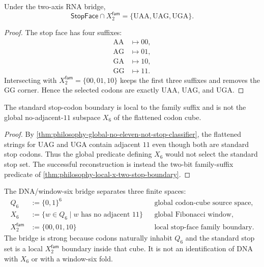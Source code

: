 \begin{theorem}
\label{thm:philosophy-local-x-two-stop-boundary}
Under the two-axis RNA bridge,
$$
  \mathsf{StopFace}\cap X_{2}^{\mathsf{fam}}
  =
  \{\mathrm{UAA},\mathrm{UAG},\mathrm{UGA}\}.
$$
\end{theorem}
\begin{proof}
The stop face has four suffixes:
$$
\begin{aligned}
  \mathrm{AA} &\longmapsto 00,\\
  \mathrm{AG} &\longmapsto 01,\\
  \mathrm{GA} &\longmapsto 10,\\
  \mathrm{GG} &\longmapsto 11.
\end{aligned}
$$
Intersecting with $X_{2}^{\mathsf{fam}}=\{00,01,10\}$ keeps the first
three suffixes and removes the $\mathrm{GG}$ corner. Hence the selected
codons are exactly $\mathrm{UAA}$, $\mathrm{UAG}$, and $\mathrm{UGA}$.
\end{proof}

\begin{theorem}
\label{thm:philosophy-local-x-two-not-global-x-six}
The standard stop-codon boundary is local to the family suffix and is
not the global no-adjacent-$11$ subspace $X_{6}$ of the flattened codon
cube.
\end{theorem}
\begin{proof}
By \autoref{thm:philosophy-global-no-eleven-not-stop-classifier}, the
flattened strings for $\mathrm{UAG}$ and $\mathrm{UGA}$ contain adjacent
$11$ even though both are standard stop codons. Thus the global
predicate defining $X_{6}$ would not select the standard stop set. The
successful reconstruction is instead the two-bit family-suffix
predicate of \autoref{thm:philosophy-local-x-two-stop-boundary}.
\end{proof}

\begin{corollary}
\label{cor:philosophy-codon-cube-global-window-local-boundary}
The DNA/window-six bridge separates three finite spaces:
$$
\begin{aligned}
  Q_{6} &:= \{0,1\}^{6}
      &&\text{global codon-cube source space},\\
  X_{6} &:= \{w\in Q_{6}\mid w\text{ has no adjacent }11\}
      &&\text{global Fibonacci window},\\
  X_{2}^{\mathsf{fam}} &:= \{00,01,10\}
      &&\text{local stop-face family boundary}.
\end{aligned}
$$
The bridge is strong because codons naturally inhabit $Q_{6}$ and the
standard stop set is a local $X_{2}^{\mathsf{fam}}$ boundary inside
that cube. It is not an identification of DNA with $X_{6}$ or with a
window-six fold.
\end{corollary}

